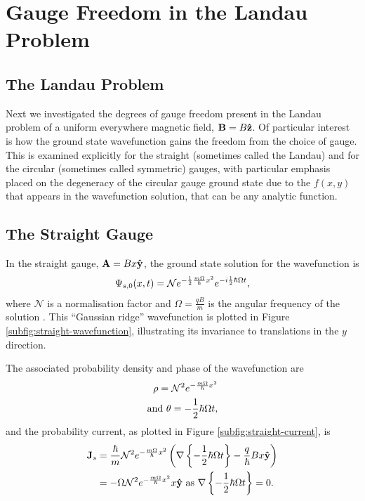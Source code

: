 \section{Gauge Freedom in the Landau Problem}
\label{sec:landau}

\subsection{The Landau Problem}

Next we investigated the degrees of gauge freedom present in the Landau problem
of a uniform everywhere magnetic field, $\mathbf{B} = B \mathbf{\hat z }$. Of
particular interest is how the ground state wavefunction gains the freedom from
the choice of gauge. This is examined explicitly for the straight (sometimes
called the Landau) and for the circular (sometimes called symmetric) gauges,
with particular emphasis placed on the degeneracy of the circular gauge ground
state due to the $f(x,y)$ that appears in the wavefunction solution, that can be
any analytic function.

\subsection{The Straight Gauge}

In the straight gauge, $\mathbf{A} = Bx\mathbf{\hat y }$, the ground state solution for
the wavefunction is
\begin{align}
    \Psi_{s,0}(x,t) = \mathcal{N} e^{- \frac{1}{2} \frac{m \Omega}{\hbar} x^2} e^{-i \frac{1}{2}
        \hbar \Omega t},
\end{align}
where $\mathcal{N}$ is a normalisation factor and $\Omega = \frac{qB}{m}$ is the
angular frequency of the solution \cite{murayama}. This ``Gaussian ridge''
wavefunction is plotted in Figure \ref{subfig:straight-wavefunction},
illustrating its invariance to translations in the $y$ direction.

The associated probability density and phase of the wavefunction are
\begin{align}
    \rho = \mathcal{N}^2 e^{- \frac{m \Omega}{\hbar} x^2} \\
    \mathrm{and}~ \theta = - \frac{1}{2} \hbar \Omega t,
\end{align}
and the probability current, as plotted in Figure \ref{subfig:straight-current},
is
\begin{align}
    \mathbf{J}_s &= \frac{\hbar}{m} \mathcal{N}^2 e^{- \frac{m \Omega}{\hbar} x^2} \left(
        \nabla \left\{ -\frac{1}{2} \hbar \Omega t \right\} - \frac{q}{\hbar} B
        x \mathbf{\hat y } \right) \\
    &= - \Omega \mathcal{N}^2 e^{- \frac{m \Omega}{\hbar} x^2} x\mathbf{\hat y } ~\mathrm{as}~
        \nabla \left\{ -\frac{1}{2} \hbar \Omega t \right\} = 0.
\end{align}

